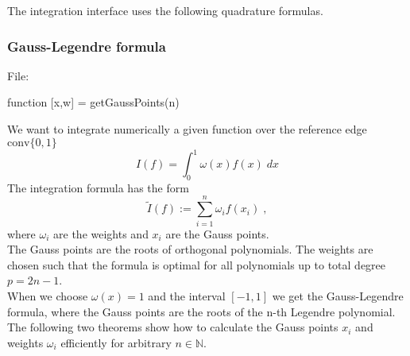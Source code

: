 \noindent
The integration interface uses the following quadrature formulas.

\subsubsection{Gauss-Legendre formula}$ $\\
File: 
\begin{pcode}
function [x,w] = getGaussPoints(n)
\end{pcode}

\medskip
\noindent
We want to integrate numerically  a given function over the reference edge $\textrm{conv}\{0,1\}$
\begin{equation*}
 I(f) = \int_0^1\omega(x)f(x)\;dx
\end{equation*}
The integration formula has the form
\begin{equation*}
    \widetilde{I}(f) := \sum_{i=1}^n\omega_i f(x_i)\; ,
\end{equation*}
where $\omega_i$ are the weights and $x_i$ are the Gauss points.\\
The Gauss points are the roots of orthogonal polynomials. The weights are chosen such that the
formula is optimal for all polynomials up to total degree $p=2n-1$.\\
When we choose $\omega(x)=1$ and the interval $[-1,1]$ we get the Gauss-Legendre formula, where
the Gauss points are the roots of the n-th Legendre polynomial.\\
The following two theorems show how to calculate the Gauss points $x_i$ and weights $\omega_i$ efficiently for arbitrary $n\in\mathbb{N}$.
%
